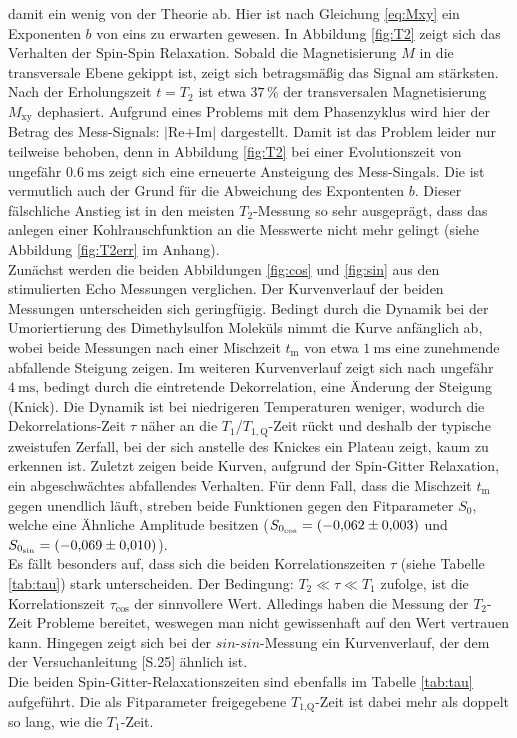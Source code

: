 damit ein wenig von der Theorie ab. Hier ist nach Gleichung \ref{eq:Mxy} ein Exponenten $b$ von
eins zu erwarten gewesen. In Abbildung \ref{fig:T2} zeigt sich das Verhalten der
Spin-Spin Relaxation. Sobald die Magnetisierung $M$ in die transversale Ebene gekippt
ist, zeigt sich betragsmäßig das Signal am stärksten. Nach der Erholungszeit
$t=T_2$ ist etwa $37\,\%$ der transversalen Magnetisierung $M_{\text{xy}}$
dephasiert. Aufgrund eines Problems mit dem Phasenzyklus wird hier der
Betrag des Mess-Signals: $|$Re$+$Im$|$ dargestellt. Damit ist das Problem leider
nur teilweise behoben, denn in Abbildung \ref{fig:T2} bei einer Evolutionszeit
von ungefähr $\SI{0,6}{\milli\second}$ zeigt sich eine erneuerte Ansteigung des
Mess-Singals. Die ist vermutlich auch der Grund für die Abweichung des Expontenten $b$.
Dieser fälschliche Anstieg ist in den meisten $T_2$-Messung so sehr ausgeprägt, dass
das anlegen einer Kohlrauschfunktion an die Messwerte nicht mehr gelingt (siehe Abbildung
\ref{fig:T2err} im Anhang).\\
Zunächst werden die beiden Abbildungen \ref{fig:cos} und \ref{fig:sin} aus den
stimulierten Echo Messungen verglichen. Der Kurvenverlauf der beiden Messungen
unterscheiden sich geringfügig. Bedingt durch die Dynamik bei der Umoriertierung
des Dimethylsulfon Moleküls nimmt die Kurve anfänglich ab, wobei beide Messungen
nach einer Mischzeit $t_{\text{m}}$ von etwa $\SI{1}{\milli\second}$ eine zunehmende
abfallende Steigung zeigen.
Im weiteren Kurvenverlauf zeigt sich nach ungefähr $\SI{4}{\milli\second}$,
bedingt durch die eintretende Dekorrelation, eine Änderung der Steigung (Knick).
Die Dynamik ist bei niedrigeren Temperaturen weniger, wodurch die Dekorrelations-Zeit
$\tau$ näher an die $T_1$/$T_{1,{\text{Q}}}$-Zeit rückt und deshalb der typische
zweistufen Zerfall, bei der sich anstelle des Knickes ein Plateau zeigt, kaum zu erkennen ist.
Zuletzt zeigen beide Kurven, aufgrund der Spin-Gitter Relaxation, ein
abgeschwächtes abfallendes Verhalten. Für denn Fall, dass die
Mischzeit $t_{\text{m}}$ gegen unendlich läuft, streben beide Funktionen gegen den
Fitparameter $S_0$, welche eine Ähnliche Amplitude besitzen ($S_{0_{\text{cos}}} = \SI{-0.062\pm0.003}{}$ und
$S_{0_{\text{sin}}} = \SI{-0.069\pm0.01}{}$).\\
Es fällt besonders auf, dass sich die beiden Korrelationszeiten $\tau$ (siehe
Tabelle \ref{tab:tau}) stark unterscheiden. Der Bedingung: $T_2 \ll \tau \ll T_1$
zufolge, ist die Korrelationszeit $\tau_{\text{cos}}$ der sinnvollere Wert.
Alledings haben die Messung der $T_2$-Zeit Probleme bereitet, weswegen man
nicht gewissenhaft auf den Wert vertrauen kann. Hingegen zeigt sich bei der
$sin$-$sin$-Messung ein Kurvenverlauf, der dem der Versuchanleitung \cite{Anleitung}[S.25]
ähnlich ist.\\
Die beiden Spin-Gitter-Relaxationszeiten sind ebenfalls im Tabelle \ref{tab:tau}
aufgeführt. Die als Fitparameter freigegebene $T_{1\text{,Q}}$-Zeit ist dabei mehr
als doppelt so lang, wie die $T_1$-Zeit.

